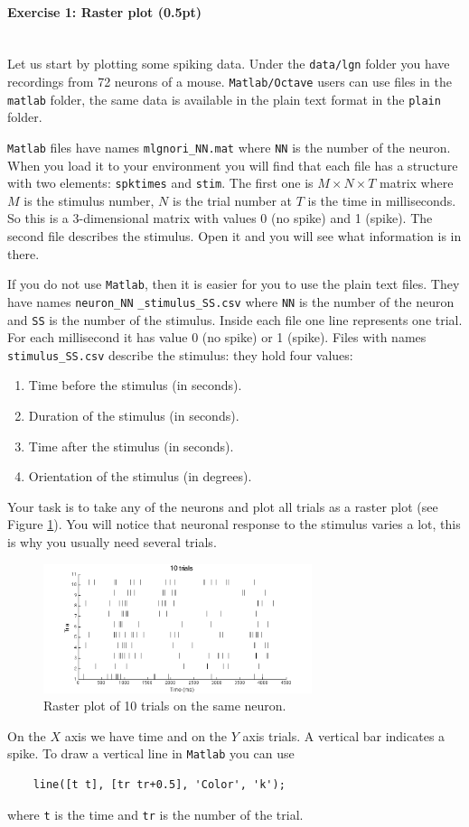 \documentclass[a4paper,11pt]{article}
\newenvironment{exercise}[3]{\paragraph{Exercise #1: #2 (#3pt)}\ \\}{
\medskip}
\begin{document}
\begin{exercise}{1}{Raster plot}{0.5}
Let us start by plotting some spiking data. Under the \texttt{data/lgn} folder you have recordings from 72 neurons of a mouse. \texttt{Matlab/Octave} users can use files in the \texttt{matlab} folder, the same data is available in the plain text format in the \texttt{plain} folder.

\texttt{Matlab} files have names \texttt{mlgnori\_NN.mat} where \texttt{NN} is the number of the neuron. When you load it to your environment you will find that each file has a structure with two elements: \texttt{spktimes} and \texttt{stim}. The first one is $M\times N \times T$ matrix where $M$ is the stimulus number, $N$ is the trial number at $T$ is the time in milliseconds. So this is a 3-dimensional matrix with values 0 (no spike) and 1 (spike). The second file describes the stimulus. Open it and you will see what information is in there.

If you do not use \texttt{Matlab}, then it is easier for you to use the plain text files. They have names \texttt{neuron\_NN} \texttt{\_stimulus\_SS.csv} where \texttt{NN} is the number of the neuron and \texttt{SS} is the number of the stimulus. Inside each file one line represents one trial. For each millisecond it has value 0 (no spike) or 1 (spike). Files with names \texttt{stimulus\_SS.csv} describe the stimulus: they hold four values:
\begin{enumerate}
\itemsep 0em
	\item Time before the stimulus (in seconds).
	\item Duration of the stimulus (in seconds).
	\item Time after the stimulus (in seconds).
	\item Orientation of the stimulus (in degrees).
\end{enumerate}
Your task is to take any of the neurons and plot all trials as a raster plot (see Figure \ref{fig:raster_plot}). You will notice that neuronal response to the stimulus varies a lot, this is why you usually need several trials.
\begin{figure}[H]
   \centering
   \includegraphics[width=0.7\textwidth]{raster10tr.png} 
   \caption{Raster plot of 10 trials on the same neuron.}
   \label{fig:raster_plot}
\end{figure}
On the $X$ axis we have time and on the $Y$ axis trials. A vertical bar indicates a spike. To draw a vertical line in \texttt{Matlab} you can use
\begin{verbatim}
	line([t t], [tr tr+0.5], 'Color', 'k');
\end{verbatim}
where \texttt{t} is the time and \texttt{tr} is the number of the trial.
\end{exercise}
\end{document}
